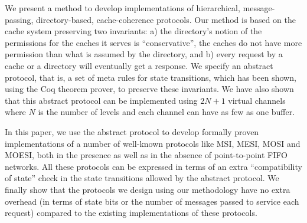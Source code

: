 We present a method to develop implementations of hierarchical,
message-passing, directory-based, cache-coherence protocols. Our method is
based on the cache system preserving two invariants: a) the directory's notion
of the permissions for the caches it serves is ``conservative'', \ie the caches
do not have more permission than what is assumed by the directory, and b) every
request by a cache or a directory will eventually get a response. We specify an
abstract protocol, that is, a set of meta rules for state transitions, which
has been shown, using the Coq theorem prover, to preserve these invariants. We
have also shown that this abstract protocol can be implemented using $2N + 1$
virtual channels where $N$ is the number of levels and each channel can have as
few as one buffer. 

In this paper, we use the abstract protocol to develop formally proven
implementations of a number of well-known protocols like MSI, MESI, MOSI and
MOESI, both in the presence as well as in the absence of point-to-point FIFO
networks. All these protocols can be expressed in terms of an extra
``compatibility of state'' check in the state transitions allowed by the
abstract protocol. We finally show that the protocols we design using our
methodology have no extra overhead (in terms of state bits or the number of
messages passed to service each request) compared to the existing
implementations of these protocols. 

